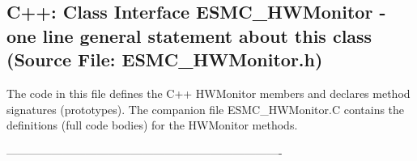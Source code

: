  
\parskip        0pt
\parindent      0pt
\baselineskip  11pt
 
\def\bv{\begin{verbatim}}
\def\ev{\end{verbatim}}
\def\be{\begin{equation}}
\def\ee{\end{equation}}
\def\bea{\begin{eqnarray}}
\def\eea{\end{eqnarray}}
\def\bi{\begin{itemize}}
\def\ei{\end{itemize}}
\def\bn{\begin{enumerate}}
\def\en{\end{enumerate}}
\def\bd{\begin{description}}
\def\ed{\end{description}}
\def\({\left (}
\def\){\right )}
\def\[{\left [}
\def\]{\right ]}
\def\<{\left  \langle}
\def\>{\right \rangle}
\def\cI{{\cal I}}
\def\diag{\mathop{\rm diag}}
\def\tr{\mathop{\rm tr}}


 
\subsection{C++:  Class Interface ESMC\_HWMonitor - one line general statement about this class (Source File: ESMC\_HWMonitor.h)}


  
  
   The code in this file defines the C++ HWMonitor members and declares method 
   signatures (prototypes).  The companion file ESMC\_HWMonitor.C contains
   the definitions (full code bodies) for the HWMonitor methods.
  
   
  
  -------------------------------------------------------------------------
   
